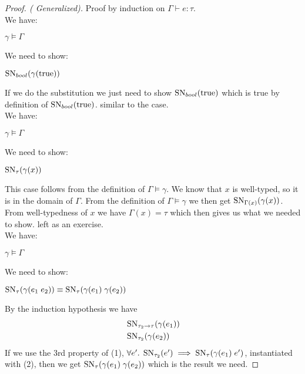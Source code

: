 \begin{proof}[Proof. ( Generalized)] Proof by induction on $\Gamma \vdash e : \tau$.
 \\
We have: 
\begin{description}
  \item $\gamma \models \Gamma$
\end{description}
We need to show:
\begin{description}
  \item $\operatorname{SN}_{bool}(\gamma(\text{true}))$
\end{description}
If we do the substitution we just need to show $\operatorname{SN}_{bool}(\text{true})$ which is true by definition of $\operatorname{SN}_{bool}(\text{true})$.
 similar to the \true{} case.
\case{\TVar}\\
We have: 
\begin{description}
  \item $\gamma \models \Gamma$
\end{description}
We need to show:
\begin{description}
  \item $\operatorname{SN}_{\tau}(\gamma(x))$
\end{description}
This case follows from the definition of $\Gamma \models \gamma$. We know that $x$ is well-typed, so it is in the domain of $\Gamma$. From the definition of $\Gamma \models \gamma$ we then get $\operatorname{SN}_{\Gamma(x)}(\gamma(x))$. From well-typedness of $x$ we have $\Gamma(x) = \tau$ which then gives us what we needed to show.
 left as an exercise.
\case{\TApp}\\
We have: 
\begin{description}
  \item $\gamma \models \Gamma$
\end{description}
We need to show:
\begin{description}
  \item $\operatorname{SN}_{\tau}(\gamma(e_1 \; e_2)) \equiv \operatorname{SN}_{\tau}(\gamma(e_1) \; \gamma(e_2))$
\end{description}
By the induction hypothesis we have
\begin{align}
  &\operatorname{SN}_{ \tau_2 \rightarrow \tau}(\gamma(e_1)) \\
  &\operatorname{SN}_{\tau_2}(\gamma(e_2))
\end{align}
If we use the 3rd property of (1), $\forall e'. \; \operatorname{SN}_{\tau_2}(e') \implies \operatorname{SN}_{\tau}(\gamma(e_1) \; e')$, instantiated with (2), then we get $\operatorname{SN}_{\tau}(\gamma(e_1) \; \gamma(e_2))$ which is the result we need.

\end{proof}

